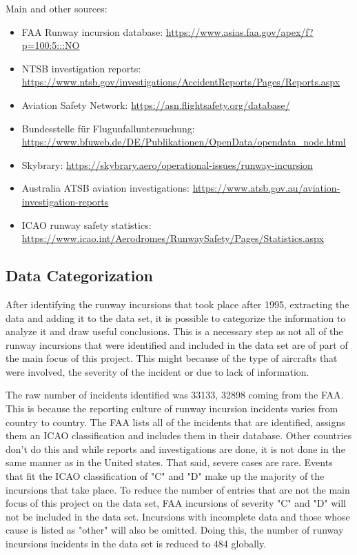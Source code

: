Main and other sources:
\begin{itemize}
    \item FAA Runway incursion database: \url{https://www.asias.faa.gov/apex/f?p=100:5:::NO}
    \item NTSB investigation reports: \url{https://www.ntsb.gov/investigations/AccidentReports/Pages/Reports.aspx}
    \item Aviation Safety Network: \url{https://asn.flightsafety.org/database/}
    \item Bundesstelle für Flugunfalluntersuchung: \url{https://www.bfuweb.de/DE/Publikationen/OpenData/opendata_node.html}
    \item Skybrary: \url{https://skybrary.aero/operational-issues/runway-incursion}
    \item Australia ATSB aviation investigations: \url{https://www.atsb.gov.au/aviation-investigation-reports}
    \item ICAO runway safety statistics: \url{https://www.icao.int/Aerodromes/RunwaySafety/Pages/Statistics.aspx}
\end{itemize}


\subsection{Data Categorization}

After identifying the runway incursions that took place after 1995, extracting the data and adding it to the data set, it is possible to categorize the information to  analyze it and draw useful conclusions. This is a necessary step as not all of the runway incursions that were identified and included in the data set are of part of the main focus of this project. This might because of the type of aircrafts that were involved, the severity of the incident or due to lack of information.

The raw number of incidents identified was 33133, 32898 coming from the FAA. This is because the reporting culture of runway incursion incidents varies from country to country. The FAA lists all of the incidents that are identified, assigns them an ICAO classification and includes them in their database. Other countries don't do this and while reports and investigations are done, it is not done in the same manner as in the United states. That said, severe cases are rare. Events that fit the ICAO classification of "C" and "D" make up the majority of the incursions that take place. To reduce the number of entries that are not the main focus of this project on the data set, FAA incursions of severity "C" and "D" will not be included in the data set. Incursions with incomplete data and those whose cause is listed as "other" will also be omitted. Doing this, the number of runway incursions incidents in the data set is reduced to 484 globally.

